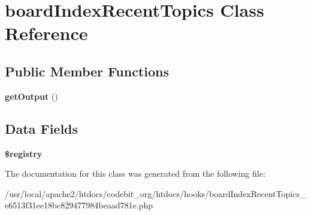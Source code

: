 \hypertarget{classboard_index_recent_topics}{\section{board\-Index\-Recent\-Topics Class Reference}
\label{classboard_index_recent_topics}
}
\subsection*{Public Member Functions}
\begin{DoxyCompactItemize}
\item 
\hypertarget{classboard_index_recent_topics_aefad4c11248b7c6fa6581c25d82bf9c6}{{\bfseries get\-Output} ()}\label{classboard_index_recent_topics_aefad4c11248b7c6fa6581c25d82bf9c6}

\end{DoxyCompactItemize}
\subsection*{Data Fields}
\begin{DoxyCompactItemize}
\item 
\hypertarget{classboard_index_recent_topics_a531e4a386aaa7f3e06d3642dc38d7e80}{{\bfseries \$registry}}\label{classboard_index_recent_topics_a531e4a386aaa7f3e06d3642dc38d7e80}

\end{DoxyCompactItemize}


The documentation for this class was generated from the following file\-:\begin{DoxyCompactItemize}
\item 
/usr/local/apache2/htdocs/codebit\-\_\-org/htdocs/hooks/board\-Index\-Recent\-Topics\-\_\-e6513f31ee18bc829477984beaad781e.\-php\end{DoxyCompactItemize}
